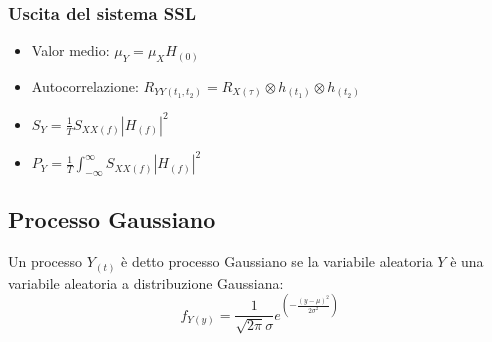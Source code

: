         \subsubsection{Uscita del sistema SSL}
            \begin{itemize}
                \item {Valor medio: $\mu_Y= \mu_X H_{(0)}$}
                \item {Autocorrelazione: $R_{YY(t_1,t_2)} = R_{X(\tau)} \otimes h_{(t_1)}\otimes h_{(t_2)}$
                }
                \item {$S_{Y} = \frac{1}{T} S_{XX(f)} |H_{(f)}|^2$}
                \item {$P_{Y} = \frac{1}{T} \int_{-\infty}^{\infty} S_{XX(f)} |H_{(f)}|^2$}
            \end{itemize}
    \subsection{Processo Gaussiano}
        Un processo $Y_{(t)}$ è detto processo Gaussiano se la variabile aleatoria $Y$ è una variabile aleatoria a distribuzione Gaussiana:
        \[
            f_{Y(y)} = \frac{1}{\sqrt{2\pi}\sigma}e^{\left(\displaystyle-\frac{(y-\mu)^2}{2\sigma^2}\right)}    
        \]
